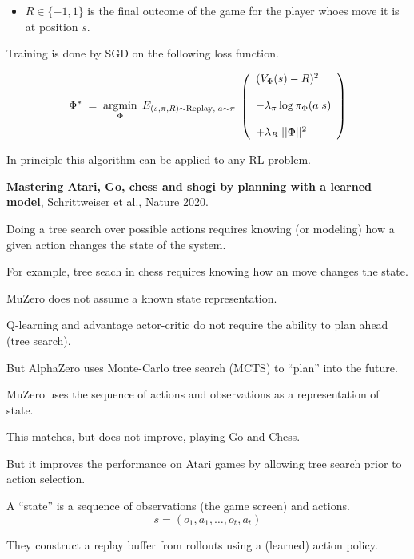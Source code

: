 {\begin{itemize}
\vfill
\item $R \in \{-1,1\}$ is the final outcome of the game for the player whoes move it is at position $s$.
\end{itemize}


\vfill
Training is done by SGD on the following loss function.

$$\Phi^*\; = \;\operatorname*{argmin}_\Phi \;E_{(s,\pi,R) \sim \mathrm{Replay},\;a \sim \pi}\;\left(\begin{array}{l} (V_\Phi(s) - R)^2 \\ \\ - \lambda_\pi\log \pi_\Phi(a|s) \\ \\ + \lambda_R\;||\Phi||^2\end{array}\right)$$

\vfill
In principle this algorithm can be applied to any RL problem.


{\bf Mastering Atari, Go, chess and shogi by planning with a learned model}, Schrittweiser et al., Nature 2020.

\vfill
Doing a tree search over possible actions requires knowing (or modeling) how a given action changes the state of the system.

\vfill
For example, tree seach in chess requires knowing how an move changes the state.

\vfill
MuZero does not assume a known state representation.


Q-learning and advantage actor-critic do not require the ability to plan ahead (tree search).

\vfill
But AlphaZero uses Monte-Carlo tree search (MCTS) to ``plan'' into the future.

\vfill
MuZero uses the sequence of actions and observations as a representation of state.

\vfill
This matches, but does not improve, playing Go and Chess.

\vfill
But it improves the performance on Atari games by allowing tree search prior to action selection.


A ``state'' is a sequence of observations (the game screen) and actions.
$$s = (o_1,a_1,\ldots,o_t,a_t)$$

\vfill
They construct a replay buffer from rollouts using a (learned) action policy.

}
